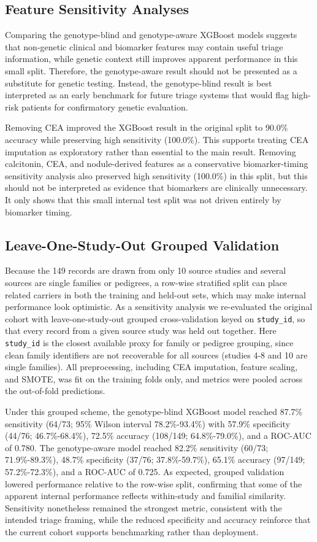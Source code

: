 \documentclass[12pt]{article}
\begin{document}
\subsection{Feature Sensitivity Analyses}
Comparing the genotype-blind and genotype-aware XGBoost models suggests that non-genetic clinical and biomarker features may contain useful triage information, while genetic context still improves apparent performance in this small split. Therefore, the genotype-aware result should not be presented as a substitute for genetic testing. Instead, the genotype-blind result is best interpreted as an early benchmark for future triage systems that would flag high-risk patients for confirmatory genetic evaluation.

Removing CEA improved the XGBoost result in the original split to 90.0\% accuracy while preserving high sensitivity (100.0\%). This supports treating CEA imputation as exploratory rather than essential to the main result. Removing calcitonin, CEA, and nodule-derived features as a conservative biomarker-timing sensitivity analysis also preserved high sensitivity (100.0\%) in this split, but this should not be interpreted as evidence that biomarkers are clinically unnecessary. It only shows that this small internal test split was not driven entirely by biomarker timing.

\subsection{Leave-One-Study-Out Grouped Validation}
Because the 149 records are drawn from only 10 source studies and several sources are single families or pedigrees, a row-wise stratified split can place related carriers in both the training and held-out sets, which may make internal performance look optimistic. As a sensitivity analysis we re-evaluated the original cohort with leave-one-study-out grouped cross-validation keyed on \texttt{study\_id}, so that every record from a given source study was held out together. Here \texttt{study\_id} is the closest available proxy for family or pedigree grouping, since clean family identifiers are not recoverable for all sources (studies 4-8 and 10 are single families). All preprocessing, including CEA imputation, feature scaling, and SMOTE, was fit on the training folds only, and metrics were pooled across the out-of-fold predictions.

Under this grouped scheme, the genotype-blind XGBoost model reached 87.7\% sensitivity (64/73; 95\% Wilson interval 78.2\%-93.4\%) with 57.9\% specificity (44/76; 46.7\%-68.4\%), 72.5\% accuracy (108/149; 64.8\%-79.0\%), and a ROC-AUC of 0.780. The genotype-aware model reached 82.2\% sensitivity (60/73; 71.9\%-89.3\%), 48.7\% specificity (37/76; 37.8\%-59.7\%), 65.1\% accuracy (97/149; 57.2\%-72.3\%), and a ROC-AUC of 0.725. As expected, grouped validation lowered performance relative to the row-wise split, confirming that some of the apparent internal performance reflects within-study and familial similarity. Sensitivity nonetheless remained the strongest metric, consistent with the intended triage framing, while the reduced specificity and accuracy reinforce that the current cohort supports benchmarking rather than deployment.
\end{document}
